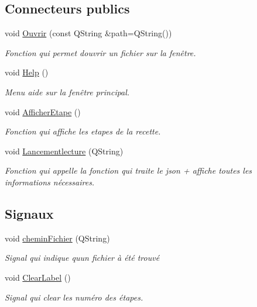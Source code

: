\subsection*{Connecteurs publics}
\begin{DoxyCompactItemize}
\item 
void \hyperlink{class_main_window_a37a30280ba05a52445ecbea9deaa5385}{Ouvrir} (const Q\+String \&path=Q\+String())
\begin{DoxyCompactList}\small\item\em Fonction qui permet d\textquotesingle{}ouvrir un fichier sur la fenêtre. \end{DoxyCompactList}\item 
void \hyperlink{class_main_window_a25ec89113c14218717cfade9a58f8fdb}{Help} ()
\begin{DoxyCompactList}\small\item\em Menu aide sur la fenêtre principal. \end{DoxyCompactList}\item 
void \hyperlink{class_main_window_ae90cd3ee3e8e0b2ddf842514fafd13dc}{Afficher\+Etape} ()
\begin{DoxyCompactList}\small\item\em Fonction qui affiche les etapes de la recette. \end{DoxyCompactList}\item 
void \hyperlink{class_main_window_ac368dfd7e2609f0cb72fc1428771aa97}{Lancementlecture} (Q\+String)
\begin{DoxyCompactList}\small\item\em Fonction qui appelle la fonction qui traite le json + affiche toutes les informations nécessaires. \end{DoxyCompactList}\end{DoxyCompactItemize}
\subsection*{Signaux}
\begin{DoxyCompactItemize}
\item 
void \hyperlink{class_main_window_a397116dafcb548fec351091cc025b822}{chemin\+Fichier} (Q\+String)
\begin{DoxyCompactList}\small\item\em Signal qui indique qu\textquotesingle{}un fichier à été trouvé \end{DoxyCompactList}\item 
void \hyperlink{class_main_window_a9a0c33e6e696ffc763560205f992650d}{Clear\+Label} ()
\begin{DoxyCompactList}\small\item\em Signal qui clear les numéro des étapes. \end{DoxyCompactList}\end{DoxyCompactItemize}
